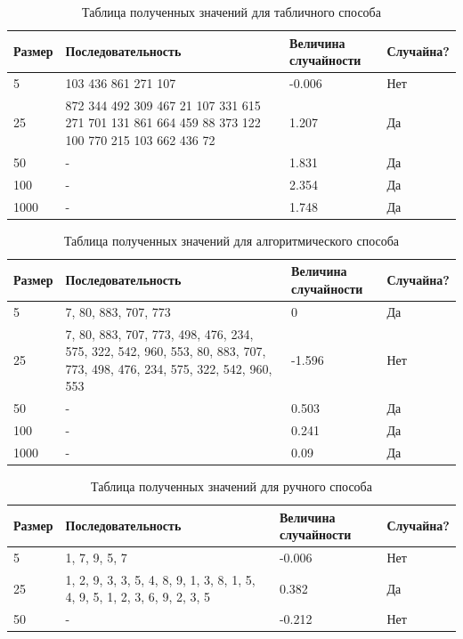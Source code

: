 \FloatBarrier
\begin{table}[h]
	\caption{Таблица полученных значений для табличного способа}
	\centering
	\begin{tabular}{ | l | p{5cm} | l | l |}
		\hline
		Размер & Последовательность & Величина случайности & Случайна? \\ 
		\hline
		5 & 103 436 861 271 107 & -0.006 & Нет  \\ 
		\hline
		25 & 872 344 492 309 467  21 107 331 615 271 701 131 861 664 459  88 373 122
		100 770 215 103 662 436  72 & 1.207 & Да \\
		\hline
		50 & - & 1.831 & Да \\
		\hline
		100 & - & 2.354 & Да  \\
		\hline
		1000 & - & 1.748 & Да \\
		\hline
	\end{tabular}
\end{table}
\FloatBarrier

\FloatBarrier
\begin{table}[h]
	\caption{Таблица полученных значений для алгоритмического способа}
	\centering
	\begin{tabular}{ | l | p{5cm} | l | l |}
		\hline
		Размер & Последовательность & Величина случайности & Случайна? \\ 
		\hline
		5 & 7, 80, 883, 707, 773 & 0 & Да  \\
		\hline
		25 & 7, 80, 883, 707, 773, 498, 476, 234, 575, 322, 542, 960, 553, 80, 883, 707, 773, 498, 476, 234, 575, 322, 542, 960, 553 & -1.596 & Нет \\
		\hline
		50 & - & 0.503 & Да \\
		\hline
		100 & - & 0.241 & Да  \\
		\hline
		1000 & - & 0.09 & Да \\
		\hline
	\end{tabular}
\end{table}
\FloatBarrier

\FloatBarrier
\begin{table}[h]
	\caption{Таблица полученных значений для ручного способа}
	\centering
	\begin{tabular}{ | l | p{5cm} | l | l |}
		\hline
		Размер & Последовательность & Величина случайности & Случайна? \\ 
		\hline
		5 & 1, 7, 9, 5, 7 & -0.006 & Нет  \\
		\hline
		25 & 1, 2, 9, 3, 3, 5, 4, 8, 9, 1, 3, 8, 1, 5, 4, 9, 5, 1, 2, 3, 6, 9, 2, 3, 5  & 0.382 & Да \\
		\hline
		50 & - & -0.212 & Нет \\
		\hline
	\end{tabular}
\end{table}
\FloatBarrier

